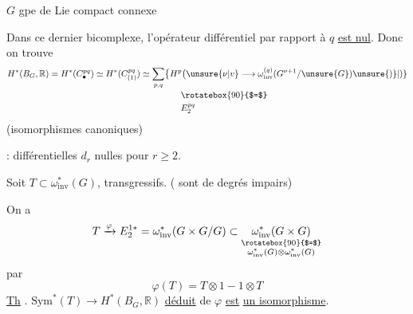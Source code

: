 $G$ gpe de Lie compact connexe


Dans ce dernier bicomplexe, l'opérateur différentiel par rapport à $q$ \uline{est nul}. Donc on trouve
\[
\begin{aligned}
H^*(B_G,\mathbb R)&=H^*(C_{\bullet}^{pq})\simeq H^*(C_{(1)}^{pq})
\simeq\sum_{p,q}\bigl\{H^p\bigl(\unsure{\nu|v}\longrightarrow
\omega_{\mathrm{inv}}^{(q)}(G^{\nu+1}/\unsure{G})\unsure{)\}|)}\\[-2pt]
&\hspace{15em}\rotatebox{90}{$=$}\\
&\hspace{15em}E_2^{pq}
\end{aligned}
\]
(isomorphismes canoniques)

 : différentielles $d_r$ nulles pour $r\geq2$.

Soit $T\subset\omega^*_{\mathrm{inv}}(G)$,  transgressifs. ( sont de degrés impairs)

On a
\[
T\xrightarrow{\varphi} E_2^{1*}=\omega_{\mathrm{inv}}^*(G\times G/G)
\subset\underset{\substack{\rotatebox{90}{$=$}\\
  \omega_{\mathrm{inv}}^*(G)\otimes\omega_{\mathrm{inv}}^*(G)}}
{\omega_{\mathrm{inv}}^*(G\times G)}
\]
par
\[
\varphi(T)=T\otimes1-1\otimes T
\]
\uline{Th} . $\mathrm{Sym}^*(T)\longrightarrow H^*(B_G,\mathbb R)$ \uline{déduit} de $\varphi$ \uline{est} \uline{un isomorphisme}.
